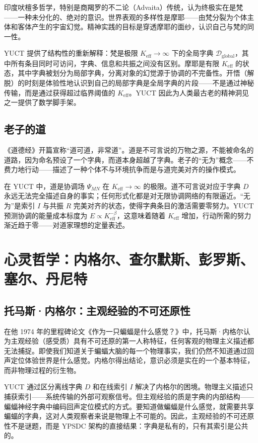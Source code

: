 \documentclass[12pt,a4paper]{article}
\begin{document}
	印度吠檀多哲学，特别是商羯罗的不二论（Advaita）传统，认为终极实在是梵——一种未分化的、绝对的意识。世界表观的多样性是摩耶——由梵分裂为个体主体和客体产生的宇宙幻觉。精神实践的目标是穿透摩耶的面纱，认识自己与梵的同一性。
	
	YUCT 提供了结构性的重新解释：梵是极限 \(K_{\mathrm{eff}} \to \infty\) 下的全局字典 \(\mathcal{D}_{\text{global}}\)，其中所有条目同时可访问，字典、信息和共振之间没有区别。摩耶是有限 \(K_{\mathrm{eff}}\) 的状态，其中字典被划分为局部字典，分离对象的幻觉源于协调的不完备性。开悟（解脱）的时刻是体验性地认识到自己的局部字典是全局字典的片段——不是通过神秘传输，而是通过获得超过临界阈值的 \(K_{\mathrm{eff}}\)。YUCT 因此为人类最古老的精神洞见之一提供了数学脚手架。
	
	\subsection{老子的道}
	
	《道德经》开篇宣称“道可道，非常道”。道是不可言说的万物之源，不能被命名的道路，因为命名预设了一个字典，而道本身超越了字典。老子的“无为”概念——不费力地行动——描述了一种个体不与环境抗争而是与道完美对齐的操作模式。
	
	在 YUCT 中，道是协调场 \(\Psi_{MN}\) 在 \(K_{\mathrm{eff}} \to \infty\) 的极限。道不可言说对应于字典 \(D\) 永远无法完全描述自身的事实；任何形式化都是对无限协调网络的有限逼近。“无为”是索引 \(I\) 与共振 \(R\) 完美对齐的状态，使得字典条目的激活需要零努力。YUCT 预测协调的能量成本标度为 \(E \propto K_{\mathrm{eff}}^{-\beta}\)，这意味着随着 \(K_{\mathrm{eff}}\) 增加，行动所需的努力渐近趋于零——对道家理想的定量表述。
	
	\section{心灵哲学：内格尔、查尔默斯、彭罗斯、塞尔、丹尼特}
	
	\subsection{托马斯·内格尔：主观经验的不可还原性}
	
	在他 1974 年的里程碑论文《作为一只蝙蝠是什么感觉？》中，托马斯·内格尔认为主观经验（感受质）具有不可还原的第一人称特征，任何客观的物理主义描述都无法捕捉。即使我们知道关于蝙蝠大脑的每一个物理事实，我们仍然不知道通过回声定位体验世界是什么感觉。内格尔得出结论，意识必须是实在的一个基本特征，而非物理过程的衍生物。
	
	YUCT 通过区分离线字典 \(D\) 和在线索引 \(I\) 解决了内格尔的困境。物理主义描述只捕获索引——系统传输的外部可观察信号。但主观经验的质是字典的内部结构——蝙蝠神经字典中编码回声定位模式的方式。要知道做蝙蝠是什么感觉，就需要共享蝙蝠的字典，这对人类观察者来说是物理上不可能的。因此，主观经验的不可还原性不是谜题，而是 YPSDC 架构的直接结果：字典是私有的，只有其索引是公共的。
	
\end{document}
